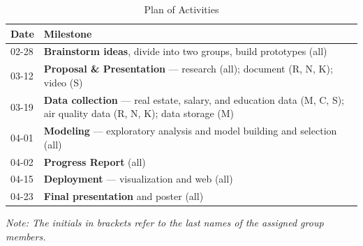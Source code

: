 \documentclass[sigconf,nonacm,11pt]{acmart}
\begin{document}
\begin{table}[H]
\caption{Plan of Activities}
\begin{minipage}{\columnwidth}
\begin{center}
\begin{tabular}{ p{0.9cm} | p{7cm}}
\textbf{Date} & \textbf{Milestone}\\
\hline
02-28 & \textbf{Brainstorm ideas}, divide into two groups, build prototypes (all)\\
03-12 & \textbf{Proposal \& Presentation} — research (all); document (R, N, K); video (S)\\
03-19 & \textbf{Data collection} — real estate, salary, and education data (M, C, S); air quality data (R, N, K); data storage (M)\\
04-01 & \textbf{Modeling} — exploratory analysis and model building and selection (all)\\
04-02 & \textbf{Progress Report} (all)\\
04-15 & \textbf{Deployment} — visualization and web (all)\\
04-23 & \textbf{Final presentation} and poster (all)\\
\hline
\end{tabular}
\end{center}
\textit{Note: The initials in brackets refer to the last names of the assigned group members.}
\end{minipage}
\end{table}

\end{document}
